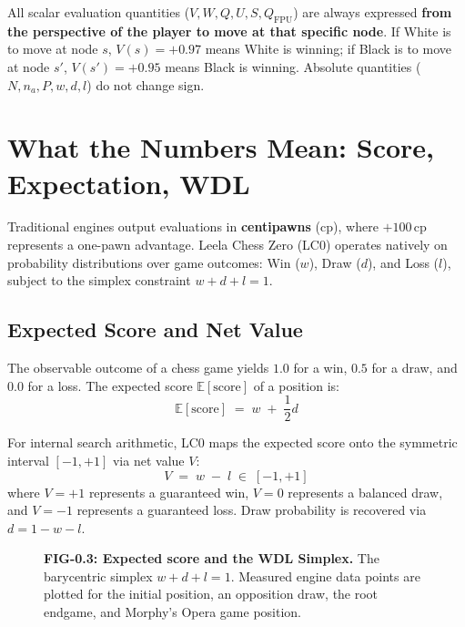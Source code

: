 \begin{established}
All scalar evaluation quantities ($V, W, Q, U, S, Q_{\text{FPU}}$) are always expressed \textbf{from the perspective of the player to move at that specific node}. If White is to move at node $s$, $V(s) = +0.97$ means White is winning; if Black is to move at node $s'$, $V(s') = +0.95$ means Black is winning. Absolute quantities ($N, n_a, P, w, d, l$) do not change sign.
\end{established}

\section{What the Numbers Mean: Score, Expectation, WDL}
\label{sec:0_3}

Traditional engines output evaluations in \textbf{centipawns} ($\text{cp}$), where $+100\,\text{cp}$ represents a one-pawn advantage. Leela Chess Zero (LC0) operates natively on probability distributions over game outcomes: Win ($w$), Draw ($d$), and Loss ($l$), subject to the simplex constraint $w + d + l = 1$.

\subsection{Expected Score and Net Value}

The observable outcome of a chess game yields $1.0$ for a win, $0.5$ for a draw, and $0.0$ for a loss. The expected score $\mathbb{E}[\text{score}]$ of a position is:
\begin{equation}
\label{eq:E1}
\boxed{\;\mathbb{E}[\text{score}] \;=\; w \;+\; \frac{1}{2}d\;}
\end{equation}

For internal search arithmetic, LC0 maps the expected score onto the symmetric interval $[-1, +1]$ via net value $V$:
\begin{equation}
\label{eq:E2}
\boxed{\;V \;=\; w \;-\; l \;\in\; [-1, +1]\;}
\end{equation}
where $V = +1$ represents a guaranteed win, $V = 0$ represents a balanced draw, and $V = -1$ represents a guaranteed loss. Draw probability is recovered via $d = 1 - w - l$.

\begin{figure}[htbp]
\centering

\caption{\textbf{FIG-0.3: Expected score and the WDL Simplex.} The barycentric simplex $w+d+l=1$. Measured engine data points are plotted for the initial position, an opposition draw, the root endgame, and Morphy's Opera game position.}
\label{fig:0_3}
\end{figure}

